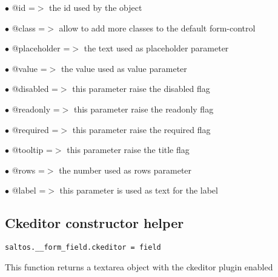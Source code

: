 \documentclass[a4paper]{book}
\begin{document}
\begin{compactitem}
\item[\color{myblue}$\bullet$] @id          =$>$ the id used by the object
\item[\color{myblue}$\bullet$] @class       =$>$ allow to add more classes to the default form-control
\item[\color{myblue}$\bullet$] @placeholder =$>$ the text used as placeholder parameter
\item[\color{myblue}$\bullet$] @value       =$>$ the value used as value parameter
\item[\color{myblue}$\bullet$] @disabled    =$>$ this parameter raise the disabled flag
\item[\color{myblue}$\bullet$] @readonly    =$>$ this parameter raise the readonly flag
\item[\color{myblue}$\bullet$] @required    =$>$ this parameter raise the required flag
\item[\color{myblue}$\bullet$] @tooltip     =$>$ this parameter raise the title flag
\item[\color{myblue}$\bullet$] @rows        =$>$ the number used as rows parameter
\item[\color{myblue}$\bullet$] @label       =$>$ this parameter is used as text for the label
\end{compactitem}

\hypertarget{toc383}{}
\subsection{Ckeditor constructor helper}

\begin{lstlisting}
saltos.__form_field.ckeditor = field
\end{lstlisting}

This function returns a textarea object with the ckeditor plugin enabled
\end{document}
